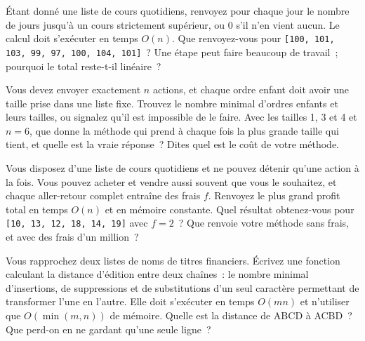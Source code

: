 \begin{question}\label{iq:iv3:algorithms:27}
Étant donné une liste de cours quotidiens, renvoyez pour chaque jour le nombre de jours jusqu'à un cours strictement supérieur, ou 0 s'il n'en vient aucun. Le calcul doit s'exécuter en temps $O(n)$. Que renvoyez-vous pour \texttt{[100, 101, 103, 99, 97, 100, 104, 101]}~? Une étape peut faire beaucoup de travail~; pourquoi le total reste-t-il linéaire~?
\end{question}

\begin{question}\label{iq:iv3:algorithms:28}
Vous devez envoyer exactement $n$ actions, et chaque ordre enfant doit avoir une taille prise dans une liste fixe. Trouvez le nombre minimal d'ordres enfants et leurs tailles, ou signalez qu'il est impossible de le faire. Avec les tailles 1, 3 et 4 et $n = 6$, que donne la méthode qui prend à chaque fois la plus grande taille qui tient, et quelle est la vraie réponse~? Dites quel est le coût de votre méthode.
\end{question}

\begin{question}\label{iq:iv3:algorithms:29}
Vous disposez d'une liste de cours quotidiens et ne pouvez détenir qu'une action à la fois. Vous pouvez acheter et vendre aussi souvent que vous le souhaitez, et chaque aller-retour complet entraîne des frais $f$. Renvoyez le plus grand profit total en temps $O(n)$ et en mémoire constante. Quel résultat obtenez-vous pour \texttt{[10, 13, 12, 18, 14, 19]} avec $f = 2$~? Que renvoie votre méthode sans frais, et avec des frais d'un million~?
\end{question}

\begin{question}\label{iq:iv3:algorithms:30}
Vous rapprochez deux listes de noms de titres financiers. Écrivez une fonction calculant la distance d'édition entre deux chaînes~: le nombre minimal d'insertions, de suppressions et de substitutions d'un seul caractère permettant de transformer l'une en l'autre. Elle doit s'exécuter en temps $O(mn)$ et n'utiliser que $O(\min(m, n))$ de mémoire. Quelle est la distance de ABCD à ACBD~? Que perd-on en ne gardant qu'une seule ligne~?
\end{question}

